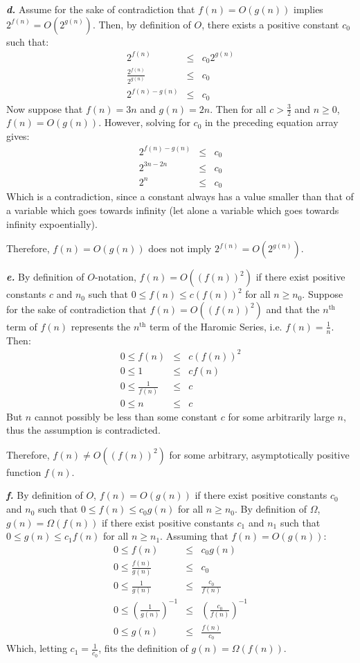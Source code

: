 \documentclass{article}
\begin{document}
\noindent\textbf{\textit{d.}} Assume for the sake of contradiction that $f(n) = O(g(n))$ implies $ 2^{f(n)} = O(2^{g(n)})$. Then, by definition of $O$, there exists a positive constant $c_0$ such that:
\begin{eqnarray*}
	2^{f(n)} & \leq & c_0 2^{g(n)} \\
	\frac{2^{f(n)}}{2^{g(n)}} & \leq & c_0 \\
	2^{f(n) - g(n)} & \leq & c_0
\end{eqnarray*}
Now suppose that $f(n) = 3n$ and $g(n) = 2n$. Then for all $c > \frac{3}{2}$ and $n \geq 0$, $f(n) = O(g(n))$. However, solving for $c_0$ in the preceding equation array gives:
\begin{eqnarray*}
	2^{f(n) - g(n)} & \leq & c_0 \\
	2^{3n - 2n} & \leq & c_0 \\
	2^n & \leq & c_0
\end{eqnarray*}
Which is a contradiction, since a constant always has a value smaller than that of a variable which goes towards infinity (let alone a variable which goes towards infinity expoentially).

Therefore, $f(n) = O(g(n))$ does not imply $2^{f(n)} = O(2^{g(n)})$.

\noindent\textbf{\textit{e.}} By definition of $O$-notation, $f(n) = O((f(n))^2)$ if there exist positive constants $c$ and $n_0$ such that $0 \leq f(n) \leq c (f(n))^2$ for all $n \geq n_0$. Suppose for the sake of contradiction that $f(n) = O((f(n))^2)$ and that the $n^{\text{th}}$ term of $f(n)$ represents the $n^{\text{th}}$ term of the Haromic Series, i.e. $f(n) = \frac{1}{n}$. Then:
\begin{eqnarray*}
	0 \leq f(n) & \leq & c (f(n))^2 \\
	0 \leq 1 & \leq & c f(n) \\
	0 \leq \frac{1}{f(n)} & \leq & c \\
	0 \leq n & \leq & c
\end{eqnarray*}
But $n$ cannot possibly be less than some constant $c$ for some arbitrarily large $n$, thus the assumption is contradicted.

Therefore, $f(n) \neq O((f(n))^2)$ for some arbitrary, asymptotically positive function $f(n)$.

\noindent\textbf{\textit{f.}} By definition of $O$, $f(n) = O(g(n))$ if there exist positive constants $c_0$ and $n_0$ such that $0 \leq f(n) \leq c_0 g(n)$ for all $n \geq n_0$. By definition of $\Omega$, $g(n) = \Omega(f(n))$ if there exist positive constants $c_1$ and $n_1$ such that $0 \leq g(n) \leq c_1 f(n)$ for all $n \geq n_1$. Assuming that $f(n) = O(g(n))$:
\begin{eqnarray*}
	0 \leq f(n) & \leq & c_0 g(n) \\
	0 \leq \frac{f(n)}{g(n)} & \leq & c_0 \\
	0 \leq \frac{1}{g(n)} & \leq & \frac{c_0}{f(n)} \\
	0 \leq \left ( \frac{1}{g(n)} \right )^{-1} & \leq & \left ( \frac{c_0}{f(n)} \right )^{-1} \\
	0 \leq g(n) & \leq & \frac{f(n)}{c_0}
\end{eqnarray*}
Which, letting $c_1 = \frac{1}{c_0}$, fits the definition of $g(n) = \Omega(f(n))$.
\end{document}
